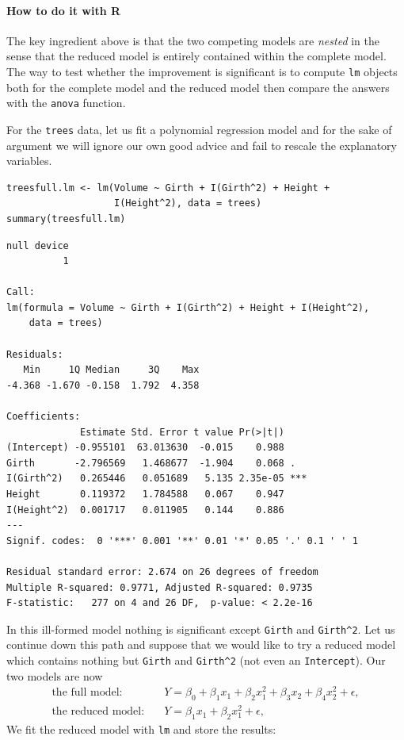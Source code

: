 \documentclass[captions=tableheading]{scrbook}
\begin{document}
\paragraph*{How to do it with \textsf{R}}

The key ingredient above is that the two competing models are \emph{nested} in the sense that the reduced model is entirely contained within the complete model. The way to test whether the improvement is significant is to compute \texttt{lm} objects both for the complete model and the reduced model then compare the answers with the \texttt{anova} function.

\begin{example}
\label{exa:mlr-trees-poly-no-rescale}

For the \texttt{trees} data, let us fit a polynomial regression model and for the sake of argument we will ignore our own good advice and fail to rescale the explanatory variables. 


\begin{verbatim}
treesfull.lm <- lm(Volume ~ Girth + I(Girth^2) + Height + 
                   I(Height^2), data = trees)
summary(treesfull.lm)
\end{verbatim}


\begin{verbatim}
null device 
          1
 
Call:
lm(formula = Volume ~ Girth + I(Girth^2) + Height + I(Height^2), 
    data = trees)

Residuals:
   Min     1Q Median     3Q    Max 
-4.368 -1.670 -0.158  1.792  4.358 

Coefficients:
             Estimate Std. Error t value Pr(>|t|)    
(Intercept) -0.955101  63.013630  -0.015    0.988    
Girth       -2.796569   1.468677  -1.904    0.068 .  
I(Girth^2)   0.265446   0.051689   5.135 2.35e-05 ***
Height       0.119372   1.784588   0.067    0.947    
I(Height^2)  0.001717   0.011905   0.144    0.886    
---
Signif. codes:  0 '***' 0.001 '**' 0.01 '*' 0.05 '.' 0.1 ' ' 1 

Residual standard error: 2.674 on 26 degrees of freedom
Multiple R-squared: 0.9771,	Adjusted R-squared: 0.9735 
F-statistic:   277 on 4 and 26 DF,  p-value: < 2.2e-16
\end{verbatim}

In this ill-formed model nothing is significant except \texttt{Girth} and \texttt{Girth\textasciicircum{}2}. Let us continue down this path and suppose that we would like to try a reduced model which contains nothing but \texttt{Girth} and \texttt{Girth\textasciicircum{}2} (not even an \texttt{Intercept}). Our two models are now
\begin{align*} 
\mbox{the full model:} & \quad Y=\beta_{0}+\beta_{1}x_{1}+\beta_{2}x_{1}^{2}+\beta_{3}x_{2}+\beta_{4}x_{2}^{2}+\epsilon,\\
\mbox{the reduced model:} & \quad Y=\beta_{1}x_{1}+\beta_{2}x_{1}^{2}+\epsilon,
\end{align*}
We fit the reduced model with \texttt{lm} and store the results:



\end{example}
\end{document}
